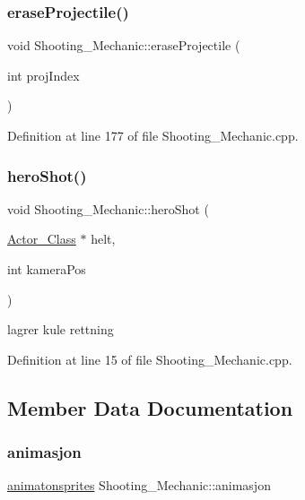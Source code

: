 \subsubsection{\texorpdfstring{erase\+Projectile()}{eraseProjectile()}}
{\footnotesize\ttfamily void Shooting\+\_\+\+Mechanic\+::erase\+Projectile (\begin{DoxyParamCaption}\item[{int}]{proj\+Index }\end{DoxyParamCaption})}



Definition at line 177 of file Shooting\+\_\+\+Mechanic.\+cpp.

\hypertarget{class_shooting___mechanic_a24b0992f715aa5e07a8d81c229401de0}{}\label{class_shooting___mechanic_a24b0992f715aa5e07a8d81c229401de0} 
\subsubsection{\texorpdfstring{hero\+Shot()}{heroShot()}}
{\footnotesize\ttfamily void Shooting\+\_\+\+Mechanic\+::hero\+Shot (\begin{DoxyParamCaption}\item[{\hyperlink{class_actor___class}{Actor\+\_\+\+Class} $\ast$}]{helt,  }\item[{int}]{kamera\+Pos }\end{DoxyParamCaption})}

lagrer kule rettning 

Definition at line 15 of file Shooting\+\_\+\+Mechanic.\+cpp.



\subsection{Member Data Documentation}
\hypertarget{class_shooting___mechanic_af5bec55c10082be57809d48c1c83254c}{}\label{class_shooting___mechanic_af5bec55c10082be57809d48c1c83254c} 
\subsubsection{\texorpdfstring{animasjon}{animasjon}}
{\footnotesize\ttfamily \hyperlink{classanimatonsprites}{animatonsprites} Shooting\+\_\+\+Mechanic\+::animasjon\hspace{0.3cm}{\ttfamily [protected]}}




